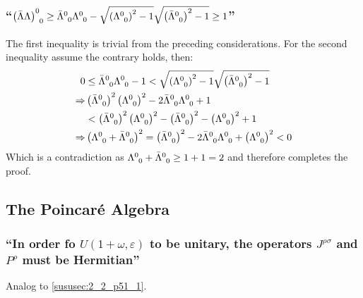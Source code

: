 \subsubsection{\enquote{$\left(\bar{\Lambda}\Lambda\right)^0_{\hphantom{0}0}\geq \bar{\Lambda}^0_{\hphantom{0}0}\Lambda^0_{\hphantom{0}0}-\sqrt{\left(\Lambda^0_{\hphantom{0}0}\right)^2-1}\sqrt{\left(\bar{\Lambda}^0_{\hphantom{0}0}\right)^2-1}\geq1$} }
The first inequality is trivial from the preceding considerations. For the second inequality assume the contrary holds, then:
\begin{align*} 
	0&\leq\bar{\Lambda}^0_{\hphantom{0}0}\Lambda^0_{\hphantom{0}0}-1<\sqrt{\left(\Lambda^0_{\hphantom{0}0}\right)^2-1}\sqrt{\left(\bar{\Lambda}^0_{\hphantom{0}0}\right)^2-1}\\
	\Rightarrow &\left(\bar{\Lambda}^0_{\hphantom{0}0}\right)^2 \left(\Lambda^0_{\hphantom{0}0}\right)^2 -2 \bar{\Lambda}^0_{\hphantom{0}0}\Lambda^0_{\hphantom{0}0}+1\\
	&<\left(\bar{\Lambda}^0_{\hphantom{0}0}\right)^2 \left(\Lambda^0_{\hphantom{0}0}\right)^2-\left(\bar{\Lambda}^0_{\hphantom{0}0}\right)^2-\left(\Lambda^0_{\hphantom{0}0}\right)^2+1\\
	\Rightarrow&\left(\Lambda^0_{\hphantom{0}0}+\bar{\Lambda}^0_{\hphantom{0}0}\right)^2=\left(\bar{\Lambda}^0_{\hphantom{0}0}\right)^2-2\bar{\Lambda}^0_{\hphantom{0}0}\Lambda^0_{\hphantom{0}0} +\left(\Lambda^0_{\hphantom{0}0}\right)^2<0
\end{align*}
Which is a contradiction as $\Lambda^0_{\hphantom{0}0}+\bar{\Lambda}^0_{\hphantom{0}0}\geq 1+1=2$ and therefore completes the proof.


\subsection{The Poincaré Algebra}\label{susec:2_4}
\subsubsection{\enquote{In order fo $U(1+\omega,\varepsilon)$ to be unitary, the operators $J^{\rho\sigma}$ and $P^\rho$ must be \textbf{Hermitian}} }
Analog to \ref{sususec:2_2_p51_1}.

